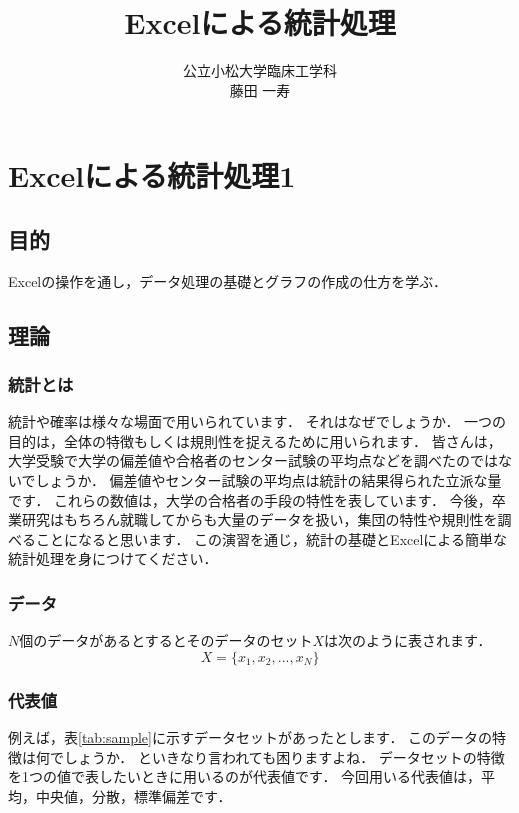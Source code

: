 \documentclass[12pt, a4j]{jreport}
\title{Excelによる統計処理}
\author{公立小松大学臨床工学科 \\ 藤田 一寿}
\date{}
\begin{document}
\maketitle

\chapter{Excelによる統計処理1}

\section{目的}

Excelの操作を通し，データ処理の基礎とグラフの作成の仕方を学ぶ．

\section{理論}

\subsection{統計とは}

統計や確率は様々な場面で用いられています．
それはなぜでしょうか．
一つの目的は，全体の特徴もしくは規則性を捉えるために用いられます．
皆さんは，大学受験で大学の偏差値や合格者のセンター試験の平均点などを調べたのではないでしょうか．
偏差値やセンター試験の平均点は統計の結果得られた立派な量です．
これらの数値は，大学の合格者の手段の特性を表しています．
今後，卒業研究はもちろん就職してからも大量のデータを扱い，集団の特性や規則性を調べることになると思います．
この演習を通じ，統計の基礎とExcelによる簡単な統計処理を身につけてください．

\subsection{データ}

$N$個のデータがあるとするとそのデータのセット$X$は次のように表されます．
\begin{equation}
    \label{eq:2}
    X = \{x_1, x_2, ..., x_N\}
\end{equation}

\subsection{代表値}

例えば，表\ref{tab:sample}に示すデータセットがあったとします．
このデータの特徴は何でしょうか．
といきなり言われても困りますよね．
データセットの特徴を1つの値で表したいときに用いるのが代表値です．
今回用いる代表値は，平均，中央値，分散，標準偏差です．
\end{document}
